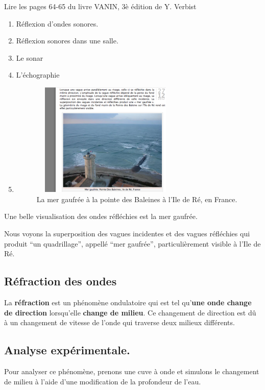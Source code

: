 Lire les pages 64-65 du livre VANIN, 3è édition de Y. Verbist
\begin{enumerate}
 \item Réflexion d'ondes sonores.
 \item Réflexion sonores dans une salle.
 \item Le sonar
 \item L'échographie
 \item
\begin{figure}
\centering
\includegraphics[width=7.13cm,height=5.433cm]{Pictures/100000010000024A000001FB96EDB4A31FE3EFC8.png}
\caption{La mer gaufrée à la pointe des Baleines à l'Ile de Ré, en France.}
\end{figure}
\end{enumerate}

Une belle visualisation des ondes réfléchies est la mer gaufrée.

Nous voyons la superposition des vagues incidentes et des vagues
réfléchies qui produit ``un quadrillage'', appellé ``mer gaufrée'',
particulièrement visible à l'Ile de Ré.

\subsection{Réfraction des ondes} %

La \textbf{réfraction} est un phénomène ondulatoire qui est tel
qu'\textbf{une onde change de direction }lorsqu'elle \textbf{change de
milieu}. Ce changement de direction est dû à un changement de vitesse de
l'onde qui traverse deux milieux différents.

\subsection{Analyse expérimentale. }

Pour analyser ce phénomène, prenons une cuve à onde et simulons le
changement de milieu à l'aide d'une modification de la profondeur de
l'eau.

